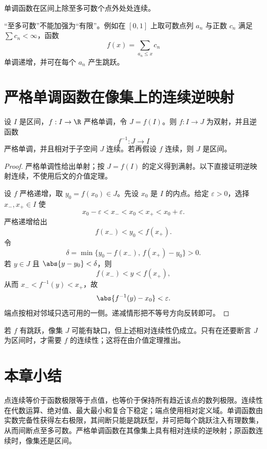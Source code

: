 \begin{corollary}
单调函数在区间上除至多可数个点外处处连续。
\end{corollary}

“至多可数”不能加强为“有限”。例如在 \([0,1]\) 上取可数点列 \(a_n\) 与正数 \(c_n\) 满足 \(\sum c_n<\infty\)，函数
\[
 f(x)=\sum_{a_n\le x}c_n
\]
单调递增，并可在每个 \(a_n\) 产生跳跃。

\section{严格单调函数在像集上的连续逆映射}

\begin{theorem}[连续逆映射]
设 \(I\) 是区间，\(f:I\to\R\) 严格单调，令 \(J=f(I)\)。则 \(f:I\to J\) 为双射，并且逆函数
\[
 f^{-1}:J\to I
\]
严格单调，并且相对于子空间 \(J\) 连续。若再假设 \(f\) 连续，则 \(J\) 是区间。
\end{theorem}

\begin{proof}
严格单调性给出单射；按 \(J=f(I)\) 的定义得到满射。以下直接证明逆映射连续，不使用后文的介值定理。

设 \(f\) 严格递增，取 \(y_0=f(x_0)\in J\)。先设 \(x_0\) 是 \(I\) 的内点。给定 \(\varepsilon>0\)，选择 \(x_-,x_+\in I\) 使
\[
 x_0-\varepsilon<x_-<x_0<x_+<x_0+\varepsilon.
\]
严格递增给出
\[
 f(x_-)<y_0<f(x_+).
\]
令
\[
 \delta=\min\{y_0-f(x_-),\,f(x_+)-y_0\}>0.
\]
若 \(y\in J\) 且 \(\abs{y-y_0}<\delta\)，则
\[
 f(x_-)<y<f(x_+),
\]
从而 \(x_-<f^{-1}(y)<x_+\)，故
\[
 \abs{f^{-1}(y)-x_0}<\varepsilon.
\]
端点按相对邻域只选可用的一侧。递减情形把不等号方向反转即可。
\end{proof}

若 \(f\) 有跳跃，像集 \(J\) 可能有缺口，但上述相对连续性仍成立。只有在还要断言 \(J\) 为区间时，才需要 \(f\) 的连续性；这将在由介值定理推出。

\section*{本章小结}

点连续等价于函数极限等于点值，也等价于保持所有趋近该点的数列极限。连续性在代数运算、绝对值、最大最小和复合下稳定；端点使用相对定义域。单调函数由实数完备性获得左右极限，其间断只能是跳跃型，并可把每个跳跃注入有理数集，从而间断点至多可数。严格单调函数在其像集上具有相对连续的逆映射；原函数连续时，像集还是区间。

